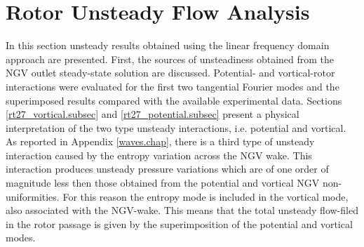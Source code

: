 %
%
%
%
\section{Rotor Unsteady Flow Analysis}
\label{rt27_unsteady.sec}
%
%
 In this section unsteady results obtained using the linear
 frequency domain approach are presented. First, the sources of unsteadiness
 obtained from the NGV outlet steady-state solution are discussed.
 Potential- and vortical-rotor interactions were evaluated for the first
 two tangential Fourier modes and the superimposed results
 compared with the available experimental data.
 Sections \ref{rt27_vortical.subsec} and \ref{rt27_potential.subsec}
 present a physical interpretation of the two type unsteady interactions, i.e.
 potential and vortical.
 As reported in Appendix \ref{waves.chap}, there is a third type of unsteady
 interaction caused by the entropy variation across the NGV wake. This interaction
 produces unsteady pressure variations which are of one order of magnitude
 less then those obtained from the potential and vortical NGV non-uniformities.
 For this reason the entropy mode is included in the vortical mode, also associated
 with the NGV-wake.
 This means that the total unsteady flow-filed in the rotor passage is given by the
 superimposition of the potential and vortical modes.
%
%
%
%
